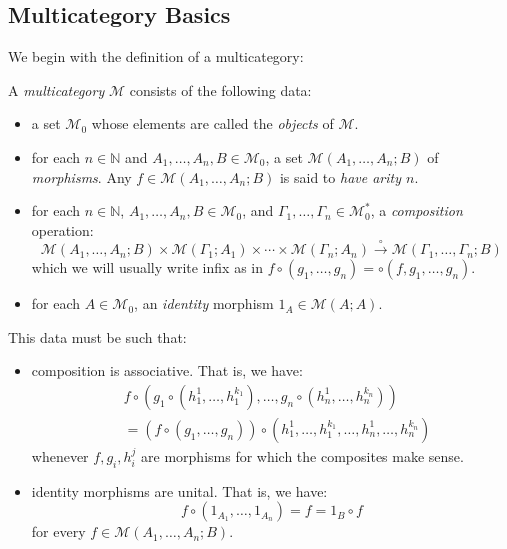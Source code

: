 \documentclass{llncs}
\begin{document}
\subsection{Multicategory Basics}\label{subsec:multicategory-basics}
We begin with the definition of a multicategory:
\begin{definition}\label{def:multicategory}
A \emph{multicategory} $\mathcal{M}$ consists of the following data:
\begin{itemize}
  \item a set $\mathcal{M}_0$ whose elements are called the \emph{objects} of $\mathcal{M}$.
  \item for each $n \in \mathbb{N}$ and $A_1, \ldots, A_n, B \in \mathcal{M}_0$, 
        a set $\mathcal{M}(A_1, \ldots, A_n; B)$ of \emph{morphisms}. Any $f \in \mathcal{M}(A_1,\ldots,A_n;B)$ is said to \emph{have arity $n$}.
  \item for each $n \in \mathbb{N}$, $A_1,\ldots,A_n,B \in \mathcal{M}_0$, and $\Gamma_1,\ldots,\Gamma_n \in \mathcal{M}_0^*$, a \emph{composition} operation:
        \[
          \mathcal{M}(A_1,\ldots,A_n;B) \times \mathcal{M}(\Gamma_1;A_1) \times \cdots \times \mathcal{M}(\Gamma_n;A_n)
          \stackrel{\circ}{\longrightarrow}
          \mathcal{M}(\Gamma_1,\ldots,\Gamma_n;B)
        \]
        which we will usually write infix as in $f \circ (g_1,\ldots,g_n) = \circ(f,g_1,\ldots,g_n)$.
  \item for each $A \in \mathcal{M}_0$, an \emph{identity} morphism $1_A \in \mathcal{M}(A; A)$.
      \end{itemize}
      This data must be such that:
      \begin{itemize}
  \item composition is associative. That is, we have:
    \begin{align*}
      & f \circ  (g_1 \circ (h_1^1, \ldots, h_1^{k_1}), \ldots, 
      g_n \circ (h_n^1, \ldots, h_n^{k_n})) \\
      &=  (f \circ  (g_1, \ldots, g_n)) \circ (h_1^1, \ldots, h_1^{k_1}, \ldots, h_n^1, \ldots, h_n^{k_n}) 
    \end{align*}
    whenever $f,g_i,h_i^j$ are morphisms for which the composites make sense.
  \item identity morphisms are unital. That is, we have:
    \[
      f \circ (1_{A_1}, \ldots, 1_{A_n}) = f = 1_B \circ f
    \]
    for every $f \in \mathcal{M}(A_1, \ldots, A_n;B)$.
\end{itemize}
\end{definition}
\end{document}
